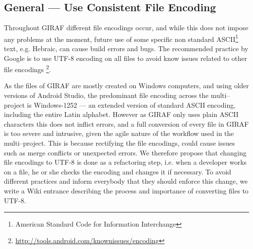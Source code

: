 \subsection{General --- Use Consistent File Encoding}
Throughout GIRAF different file encodings occur, and while this does not impose any problems at the moment, future use of some specific non standard ASCII\footnote{American Standard Code for Information Interchange} text, e.g. Hebraic, can cause build errors and bugs.
The recommended practice by Google is to use UTF-8 encoding on all files to avoid know issues related to other file encodings \footnote{\url{http://tools.android.com/knownissues/encoding}}.

As the files of GIRAF are mostly created on Windows computers, and using older versions of Android Studio, the predominant file encoding across the multi--project is Windows-1252 --- an extended version of standard ASCII encoding, including the entire Latin alphabet.
However as GIRAF only uses plain ASCII characters this does not inflict errors, and a full conversion of every file in GIRAF is too severe and intrusive, given the agile nature of the workflow used in the multi--project.
This is because rectifying the file encodings, could cause issues such as merge conflicts or unexpected errors.
We therefore propose that changing file encodings to UTF-8 is done as a refactoring step, i.e. when a developer works on a file, he or she checks the encoding and changes it if necessary.
To avoid different practices and inform everybody that they should enforce this change, we write a Wiki entrance describing the process and importance of converting files to UTF-8.
